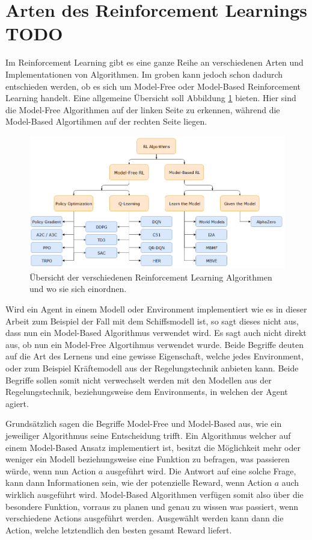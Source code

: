 \documentclass[]{iat}
\begin{document}
\section{Arten des Reinforcement Learnings TODO} \label{sec:arten_rf}
Im Reinforcement Learning gibt es eine ganze Reihe an verschiedenen Arten und Implementationen von Algorithmen. Im groben kann jedoch schon dadurch entschieden werden, ob es sich um Model-Free oder Model-Based Reinforcement Learning handelt. Eine allgemeine Übersicht soll Abbildung \ref{abb:rl_overview} bieten. Hier sind die Model-Free Algorithmen auf der linken Seite zu erkennen, während die Model-Based Algortihmen auf der rechten Seite liegen.
\begin{figure}[H]
    \includegraphics[width=\textwidth]{graphics/rl_overview.png}
    \centering
    \caption{Übersicht der verschiedenen Reinforcement Learning Algorithmen und wo sie sich einordnen. \cite[]{SpinningUp2018}}
    \label{abb:rl_overview}
\end{figure}
Wird ein Agent in einem Modell oder Environment implementiert wie es in dieser Arbeit zum Beispiel der Fall mit dem Schiffsmodell ist, so sagt dieses nicht aus, dass nun ein Model-Based Algorithmus verwendet wird. Es sagt auch nicht direkt aus, ob nun ein Model-Free Algortihmus verwendet wurde. Beide Begriffe deuten auf die Art des Lernens und eine gewisse Eigenschaft, welche jedes Environment, oder zum Beispiel Kräftemodell aus der Regelungstechnik anbieten kann. Beide Begriffe sollen somit nicht verwechselt werden mit den Modellen aus der Regelungstechnik, beziehungsweise dem Environments, in welchen der Agent agiert.

Grundsätzlich sagen die Begriffe Model-Free und Model-Based aus, wie ein jeweiliger Algorithmus seine Entscheidung trifft. Ein Algorithmus welcher auf einem Model-Based Ansatz implementiert ist, besitzt die Möglichkeit mehr oder weniger ein Modell beziehungsweise eine Funktion zu befragen, was passieren würde, wenn nun Action $a$ ausgeführt wird. Die Antwort auf eine solche Frage, kann dann Informationen sein, wie der potenzielle Reward, wenn Action $a$ auch wirklich ausgeführt wird. Model-Based Algorithmen verfügen somit also über die besondere Funktion, vorraus zu planen und genau zu wissen was passiert, wenn verschiedene Actions ausgeführt werden. Ausgewählt werden kann dann die Action, welche letztendlich den besten gesamt Reward liefert.
\end{document}
